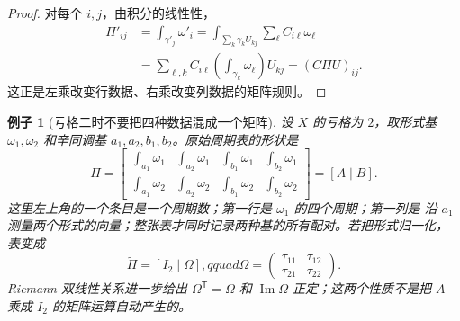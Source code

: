 \documentclass[UTF8,fontset=none,a4paper,11pt]{ctexart}
\theoremstyle{foundation-definition}
\theoremstyle{foundation-theorem}
\theoremstyle{foundation-proposition}
\theoremstyle{foundation-example}
\newtheorem{example}[definition]{例子}
\theoremstyle{foundation-remark}
\theoremstyle{foundation-theorem}
\begin{document}
\begin{proof}
对每个 \(i,j\)，由积分的线性性，
\[
\begin{aligned}
\Pi'_{ij}
 &=\int_{\gamma'_j}\omega'_i
 =\int_{\sum_k\gamma_kU_{kj}}\sum_\ell C_{i\ell}\omega_\ell\\
 &=\sum_{\ell,k}C_{i\ell}\left(\int_{\gamma_k}\omega_\ell\right)U_{kj}
 =(C\Pi U)_{ij}.
\end{aligned}
\]
这正是左乘改变行数据、右乘改变列数据的矩阵规则。
\end{proof}

\begin{example}[亏格二时不要把四种数据混成一个矩阵]
设 \(X\) 的亏格为 \(2\)，取形式基 \(\omega_1,\omega_2\) 和辛同调基
\(a_1,a_2,b_1,b_2\)。原始周期表的形状是
\[
\Pi=
\left[
\begin{array}{cc|cc}
\displaystyle\int_{a_1}\omega_1&\displaystyle\int_{a_2}\omega_1
  &\displaystyle\int_{b_1}\omega_1&\displaystyle\int_{b_2}\omega_1\\[0.7em]
\displaystyle\int_{a_1}\omega_2&\displaystyle\int_{a_2}\omega_2
  &\displaystyle\int_{b_1}\omega_2&\displaystyle\int_{b_2}\omega_2
\end{array}\right]
=[A\mid B].
\]
这里左上角的一个条目是一个周期数；第一行是 \(\omega_1\) 的四个周期；第一列是
沿 \(a_1\) 测量两个形式的向量；整张表才同时记录两种基的所有配对。若把形式归一化，
表变成
\[
  \widetilde\Pi=[I_2\mid\Omega],qquad
  \Omega=\begin{pmatrix}\tau_{11}&\tau_{12}\\\tau_{21}&\tau_{22}\end{pmatrix}.
\]
Riemann 双线性关系进一步给出 \(\Omega^{\mathsf T}=\Omega\) 和
\(\operatorname{Im}\Omega\) 正定；这两个性质不是把 \(A\) 乘成 \(I_2\) 的矩阵运算自动产生的。
\end{example}
\end{document}
